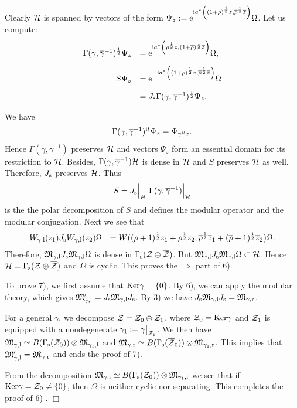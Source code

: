 \documentclass{svmult}
\def\bar{\overline}
\def\l{{\rm l}}
\def\r{{\rm r}}
\def\s{{\rm s}}
\def\12{{\frac12}}
\def\cZ{{\cal Z}}
\def\fM{{\mathfrak M}}
\def\i{{\rm i}}
\def\Ker{{\rm Ker}}
\def\qed{$\Box$\medskip}
\def\12{\frac{1}{2}}
\def\e{{\rm e}}
\def\cH{{\cal H}}
\def\l{{\rm l}}
\def\r{{\rm r}}
\def\Ker{{\rm Ker}}
\def\12{\frac{1}{2}}
\def\e{{\rm e}}
\def\cH{{\cal H}}
\def\s{{\rm s}}
\begin{document}
Clearly $\cH$ is spanned by vectors of the form $\Psi_z:=
\e^{\i a^*\left((1+\rho)^\12
  z,\bar\rho^{\12}\bar z\right) }\Omega$.
Let us compute:
\[\begin{array}{rl}
\Gamma(\gamma,\bar\gamma^{-1})^{\12}\Psi_z&=
\e^{\i a^*\left(\rho^\12
  z,(1+\bar\rho)^{\12}\bar z\right) }\Omega,\\[3mm]
S\Psi_z&=
\e^{-\i a^*\left((1+\rho)^\12
  z,\bar\rho^{\12}\bar z\right) }\Omega\\[3mm]
&=J_\s \Gamma(\gamma,\bar\gamma^{-1})^{\12}
\Psi_z.
\end{array}\]

We have
\[\Gamma(\gamma,\bar\gamma^{-1})^{\i t}
\Psi_z=
\Psi_{\gamma^{\i t}z}.\]
Hence  $\Gamma(\gamma,\bar\gamma^{-1})$ preserves $\cH$ and vectors $\Psi_z$
form an essential 
domain for its restriction to $\cH$. Besides,
 $\Gamma(\gamma,\bar\gamma^{-1})\cH$
is dense in $\cH$ and
 $S$ preserves $\cH$ as well.
Therefore, $J_\s$ preserves $\cH$.
Thus 
\[S=J_\s\Big|_\cH\ 
\Gamma(\gamma,\bar\gamma^{-1})\Big|_\cH\]
is the the polar decomposition of $S$ and defines the
modular operator and the modular conjugation.
Next we see that
\[\begin{array}{rl}
W_{\gamma,\l}(z_1)J_\s W_{\gamma,\l}(z_2)\Omega&
=W((\rho+1)^{\frac12} z_1+\rho^{\frac12}z_2,
\bar\rho^{\frac12}\bar z_1+
(\bar\rho+1)^{\frac12} \bar z_2\bigr)\Omega
.\end{array}\]
Therefore,
 $\fM_{\gamma,\l}J_\s\fM_{\gamma,\l}\Omega$ is dense 
in $\Gamma_\s(\cZ\oplus\bar\cZ)$.
But $\fM_{\gamma,\l}J_\s\fM_{\gamma,\l}\Omega\subset\cH$.
 Hence 
$\cH=\Gamma_\s(\cZ\oplus\bar\cZ)$ and  $\Omega$ is cyclic.
This proves the $\Rightarrow$ part of 6).



To prove 7), 
we first assume that $\Ker\gamma=\{0\}$. By 6), we can apply
 the modular theory, which   gives
$\fM_{\gamma,\l}'=J_\s\fM_{\gamma,\l}J_\s$.
By 3) we have
 $J_\s\fM_{\gamma,\l}J_\s=\fM_{\gamma,\r}$. 

For a general $\gamma$,
 we decompose $\cZ=\cZ_0\oplus\cZ_1$, where $\cZ_0=\Ker\gamma$
and $\cZ_1$ is equipped 
with a nondegenerate $\gamma_1:=\gamma\big|_{\cZ_1}$.  We
then have $\fM_{\gamma,\l}\simeq B(\Gamma_\s(\cZ_0))\otimes\fM_{\gamma_1,\l}$
and $\fM_{\gamma,\r}\simeq B(\Gamma_\s(\bar\cZ_0))\otimes\fM_{\gamma_1,\r}$.
This implies that $\fM_{\gamma,\l}'=\fM_{\gamma,\r}$ and ends the proof of 7).


From the decomposition
 $\fM_{\gamma,\l}\simeq B(\Gamma_\s(\cZ_0))\otimes\fM_{\gamma_1,\l}$
 we see that if $\Ker\gamma=\cZ_0\neq\{0\}$, then $\Omega$ is neither cyclic
 nor separating. This completes the proof  of 6) \cite{EO}. \qed
\end{document}
